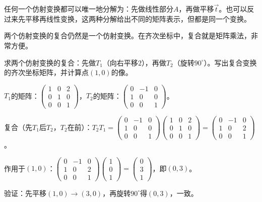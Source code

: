 
任何一个仿射变换都可以唯一地分解为：先做线性部分$A$，再做平移$\vec t$。也可以反过来先平移再线性变换，这两种分解给出不同的矩阵表示，但都是同一个变换。

两个仿射变换的复合仍然是一个仿射变换。在齐次坐标中，复合就是矩阵乘法，非常方便。

\begin{example}
求两个仿射变换的复合：先做$T_1$（向右平移$2$），再做$T_2$（旋转$90^\circ$）。写出复合变换的齐次坐标矩阵，并计算点$(1,0)$的像。
\end{example}
\begin{solution}
$T_1$的矩阵：$\begin{pmatrix}1&0&2\\0&1&0\\0&0&1\end{pmatrix}$，$T_2$的矩阵：$\begin{pmatrix}0&-1&0\\1&0&0\\0&0&1\end{pmatrix}$。

复合（先$T_1$后$T_2$，$T_2$在前）：$T_2T_1=\begin{pmatrix}0&-1&0\\1&0&0\\0&0&1\end{pmatrix}\begin{pmatrix}1&0&2\\0&1&0\\0&0&1\end{pmatrix}=\begin{pmatrix}0&-1&0\\1&0&2\\0&0&1\end{pmatrix}$。

作用于$(1,0)$：$\begin{pmatrix}0&-1&0\\1&0&2\\0&0&1\end{pmatrix}\begin{pmatrix}1\\0\\1\end{pmatrix}=\begin{pmatrix}0\\3\\1\end{pmatrix}$，即$(0,3)$。

验证：先平移$(1,0)\to(3,0)$，再旋转$90^\circ$得$(0,3)$，一致。
\end{solution}

